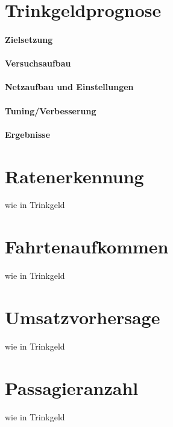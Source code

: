 \label{Prognosen}
\section{Trinkgeldprognose}
\label{sec:TipPred}
\paragraph{Zielsetzung}
\paragraph{Versuchsaufbau}
\paragraph{Netzaufbau und Einstellungen}
\paragraph{Tuning/Verbesserung}
\paragraph{Ergebnisse}
\section{Ratenerkennung}
\label{sec:RatePred}
wie in Trinkgeld
\section{Fahrtenaufkommen}
\label{sec:RidesPred}
wie in Trinkgeld
\section{Umsatzvorhersage}
\label{sec:RevPred}
wie in Trinkgeld
\section{Passagieranzahl}
\label{sec:PasPred}
wie in Trinkgeld